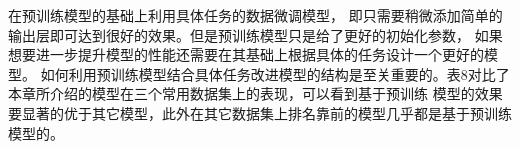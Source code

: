 \documentclass{article}
\newcommand{\upcite}[1]{\textsuperscript{\textsuperscript{\cite{#1}}}}
\begin{document}
在预训练模型的基础上利用具体任务的数据微调模型，
即只需要稍微添加简单的输出层即可达到很好的效果。但是预训练模型只是给了更好的初始化参数，
如果想要进一步提升模型的性能还需要在其基础上根据具体的任务设计一个更好的模型。
如何利用预训练模型结合具体任务改进模型的结构是至关重要的。表8对比了本章所介绍的模型在三个常用数据集上的表现，可以看到基于预训练
模型的效果要显著的优于其它模型，此外在其它数据集上排名靠前的模型几乎都是基于预训练模型的。
\end{document}

